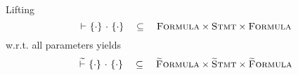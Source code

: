 Lifting 
$${~} \,\,{\vdash}\,\, \{{\cdot}\} ~{\cdot}~ \{{\cdot}\} ~~~\subseteq~~~ \textup{\textsc{Formula}} \times \textup{\textsc{Stmt}} \times \textup{\textsc{Formula}}$$
w.r.t. all parameters yields
$${~} \,\,\widetilde{\vdash}\,\, \{{\cdot}\} ~{\cdot}~ \{{\cdot}\} ~~~\subseteq~~~ \textup{\textsc{\ensuremath{\widetilde{\text{F}}}ormula}} \times \textup{\textsc{\ensuremath{\widetilde{\text{S}}}tmt}} \times \textup{\textsc{\ensuremath{\widetilde{\text{F}}}ormula}}$$

\begin{comment}
It is worth noting that optimality of $\gthoare {~} {\cdot} {\cdot} {\cdot}$ is not required and in practice even potentially contra-productive in the light of decidability.
Consider the example:
Optimality discussion:
\begin{verbatim}
{i = 10000}
n = collatzIterations(300, i);
{1 <= n * n <= 4}
{n = 4}
staticAssert (n = 4);
{n = 4}
\end{verbatim}
...not verifiable with optimal lifting!
\end{comment}

